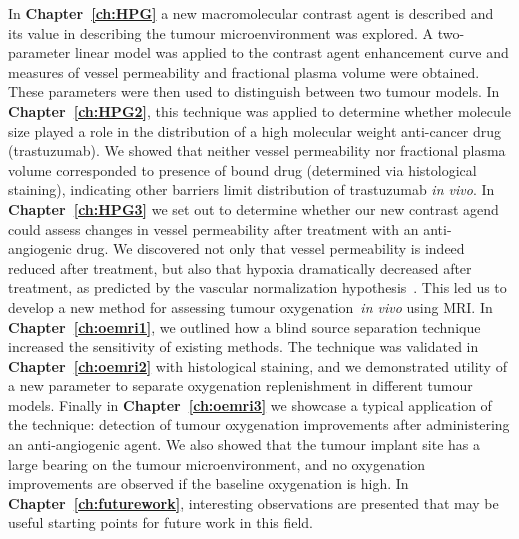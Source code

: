 In \textbf{Chapter~\ref{ch:HPG}} a new macromolecular contrast agent is described and its value in describing the tumour microenvironment was explored.
A two-parameter linear model was applied to the contrast agent enhancement curve and measures of vessel permeability and fractional plasma volume were obtained.
These parameters were then used to distinguish between two tumour models.
In \textbf{Chapter~\ref{ch:HPG2}}, this technique was applied to determine whether molecule size played a role in the distribution of a high molecular weight anti-cancer drug (trastuzumab).
We showed that neither vessel permeability nor fractional plasma volume corresponded to presence of bound drug (determined via histological staining), indicating other barriers limit distribution of trastuzumab \emph{in vivo}.
In \textbf{Chapter~\ref{ch:HPG3}} we set out to determine whether our new contrast agend could assess changes in vessel permeability after treatment with an anti-angiogenic drug.
We discovered not only that vessel permeability is indeed reduced after treatment, but also that hypoxia dramatically decreased after treatment, as predicted by the vascular normalization hypothesis~\cite{Jain:2005gk}. 
This led us to develop a new method for assessing tumour oxygenation~\emph{in vivo} using MRI.
In \textbf{Chapter~\ref{ch:oemri1}}, we outlined how a blind source separation technique increased the sensitivity of existing methods. 
The technique was validated in \textbf{Chapter~\ref{ch:oemri2}} with histological staining, and we demonstrated utility of a new parameter to separate oxygenation replenishment in different tumour models.
Finally in \textbf{Chapter~\ref{ch:oemri3}} we showcase a typical application of the technique: detection of tumour oxygenation improvements after administering an anti-angiogenic agent. 
We also showed that the tumour implant site has a large bearing on the tumour microenvironment, and no oxygenation improvements are observed if the baseline oxygenation is high.
In \textbf{Chapter~\ref{ch:futurework}}, interesting observations are presented that may be useful starting points for future work in this field.